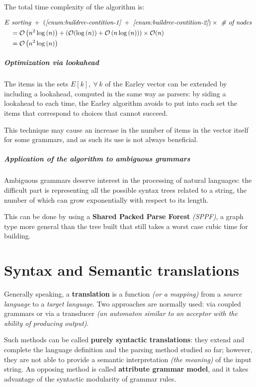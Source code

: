 \documentclass[english]{article}
\begin{document}
The total time complexity of the algorithm is:

\begin{align*}
   & E \ \textit{sorting} \ + \ \left(\textit{\ref{enum:buildree-contition-1}} \ + \ \textit{\ref{enum:buildree-contition-2}} \right) \times \ \textit{\# of nodes} \ \\
   & \quad = \mathcal{O}\left( n^2 \log{(n)} \right) + \left( \mathcal{O}(\log{(n)}) + \mathcal{O}\left( n \log{(n)} \right) \right) \times \mathcal{O}(n)            \\
   & \quad = \mathcal{O}\left( n^2 \log{(n)} \right)
\end{align*}

\subparagraph*{Optimization via lookahead}

The items in the sets \(E[k], \ \forall \, k\) of the Earley vector can be extended by including a lookahead, computed in the same way as \elro parsers:
by siding a lookahead to each time, the Earley algorithm avoids to put into each set the items that correspond to choices that cannot succeed.

This technique may cause an increase in the number of items in the vector itself for some grammars, and as such its use is not always beneficial.

\subparagraph*{Application of the algorithm to ambiguous grammars}

Ambiguous grammars deserve interest in the processing of natural languages:
the difficult part is representing all the possible syntax trees related to a string, the number of which can grow exponentially with respect to its length.

This can be done by using a \textbf{Shared Packed Parse Forest} \textit{(SPPF)}, a graph type more general than the tree built that still takes a worst case cubic time for building.

\clearpage

\section{Syntax and Semantic translations}

Generally speaking, a \textbf{translation} is a function \textit{(or a mapping)} from a \textit{source language} to a \textit{target language}.
Two approaches are normally used:
via coupled grammars or via a transducer \textit{(an automaton similar to an acceptor with the ability of producing output)}.

Such methods can be called \textbf{purely syntactic translations}:
they extend and complete the language definition and the parsing method studied so far; however, they are not able to provide a semantic interpretation \textit{(the meaning)} of the input string.
An opposing method is called \textbf{attribute grammar model}, and it takes advantage of the syntactic modularity of grammar rules.
\end{document}
